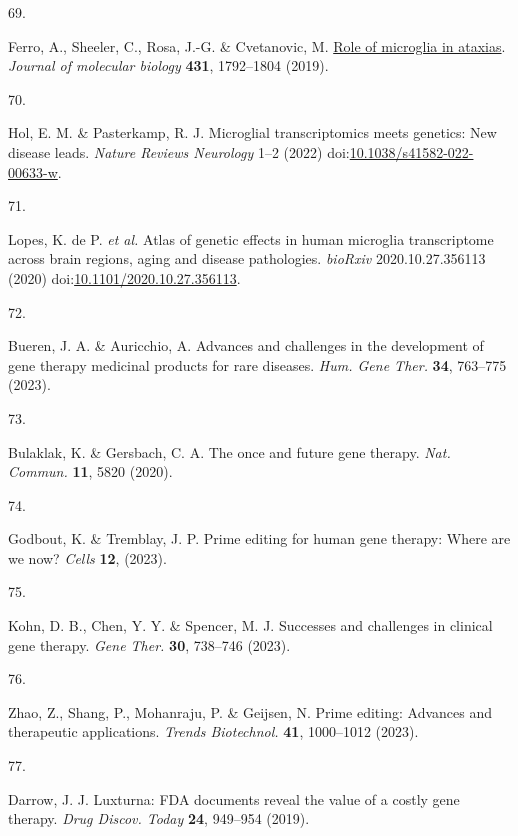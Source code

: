 \documentclass[
]{article}
\newlength{\cslhangindent}
\newlength{\csllabelwidth}
\newenvironment{CSLReferences}[2] %
 {\begin{list}{}{%
  \setlength{\itemindent}{0pt}
  \setlength{\leftmargin}{0pt}
  \setlength{\parsep}{0pt}
  \ifodd #1
   \setlength{\leftmargin}{\cslhangindent}
   \setlength{\itemindent}{-1\cslhangindent}
  \fi
  \setlength{\itemsep}{#2\baselineskip}}}
 {\end{list}}
\newcommand{\CSLLeftMargin}[1]{\parbox[t]{\csllabelwidth}{\strut#1\strut}}
\newcommand{\CSLRightInline}[1]{\parbox[t]{\linewidth - \csllabelwidth}{\strut#1\strut}}
\begin{document}
\begin{CSLReferences}{0}{0}
\CSLLeftMargin{69. }%
\CSLRightInline{Ferro, A., Sheeler, C., Rosa, J.-G. \& Cvetanovic, M.
\href{https://doi.org/10.1016/j.jmb.2019.01.016}{Role of microglia in
ataxias}. \emph{Journal of molecular biology} \textbf{431}, 1792--1804
(2019).}

\CSLLeftMargin{70. }%
\CSLRightInline{Hol, E. M. \& Pasterkamp, R. J. Microglial
transcriptomics meets genetics: New disease leads. \emph{Nature Reviews
Neurology} 1--2 (2022)
doi:\href{https://doi.org/10.1038/s41582-022-00633-w}{10.1038/s41582-022-00633-w}.}

\CSLLeftMargin{71. }%
\CSLRightInline{Lopes, K. de P. \emph{et al.} Atlas of genetic effects
in human microglia transcriptome across brain regions, aging and disease
pathologies. \emph{bioRxiv} 2020.10.27.356113 (2020)
doi:\href{https://doi.org/10.1101/2020.10.27.356113}{10.1101/2020.10.27.356113}.}

\CSLLeftMargin{72. }%
\CSLRightInline{Bueren, J. A. \& Auricchio, A. Advances and challenges
in the development of gene therapy medicinal products for rare diseases.
\emph{Hum. Gene Ther.} \textbf{34}, 763--775 (2023).}

\CSLLeftMargin{73. }%
\CSLRightInline{Bulaklak, K. \& Gersbach, C. A. The once and future gene
therapy. \emph{Nat. Commun.} \textbf{11}, 5820 (2020).}

\CSLLeftMargin{74. }%
\CSLRightInline{Godbout, K. \& Tremblay, J. P. Prime editing for human
gene therapy: Where are we now? \emph{Cells} \textbf{12}, (2023).}

\CSLLeftMargin{75. }%
\CSLRightInline{Kohn, D. B., Chen, Y. Y. \& Spencer, M. J. Successes and
challenges in clinical gene therapy. \emph{Gene Ther.} \textbf{30},
738--746 (2023).}

\CSLLeftMargin{76. }%
\CSLRightInline{Zhao, Z., Shang, P., Mohanraju, P. \& Geijsen, N. Prime
editing: Advances and therapeutic applications. \emph{Trends
Biotechnol.} \textbf{41}, 1000--1012 (2023).}

\CSLLeftMargin{77. }%
\CSLRightInline{Darrow, J. J. Luxturna: {FDA} documents reveal the value
of a costly gene therapy. \emph{Drug Discov. Today} \textbf{24},
949--954 (2019).}


\end{CSLReferences}
\end{document}

